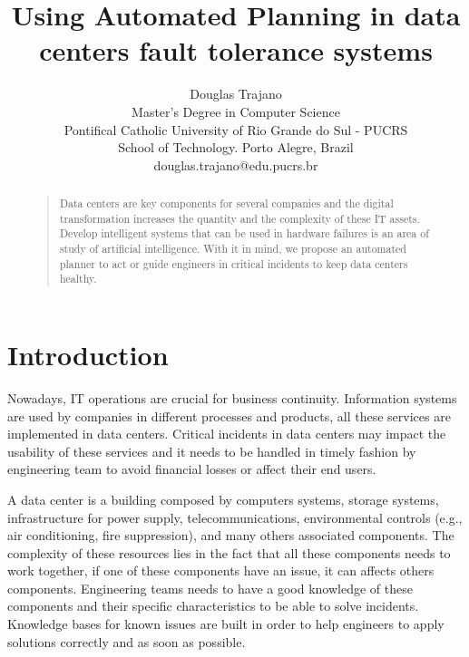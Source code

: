 \documentclass[letterpaper]{article}
\begin{document}
%
\title{Using Automated Planning in data centers fault tolerance systems}
\author{Douglas Trajano\\
Master's Degree in Computer Science\\
Pontifical Catholic University of Rio Grande do Sul - PUCRS\\
School of Technology. Porto Alegre, Brazil\\
douglas.trajano@edu.pucrs.br
}
\maketitle
\begin{abstract}
\begin{quote}
Data centers are key components for several companies and the digital transformation increases the quantity and the complexity of these IT assets. Develop intelligent systems that can be used in hardware failures is an area of study of artificial intelligence. With it in mind, we propose an automated planner to act or guide engineers in critical incidents to keep data centers healthy.
\end{quote}
\end{abstract}

\section{Introduction}

Nowadays, IT operations are crucial for business continuity. Information systems are used by companies in different processes and products, all these services are implemented in data centers. Critical incidents in data centers may impact the usability of these services and it needs to be handled in timely fashion by engineering team to avoid financial losses or affect their end users.

A data center is a building composed by computers systems, storage systems, infrastructure for power supply, telecommunications, environmental controls (e.g., air conditioning, fire suppression), and many others associated components. The complexity of these resources lies in the fact that all these components needs to work together, if one of these components have an issue, it can affects others components. Engineering teams needs to have a good knowledge of these components and their specific characteristics to be able to solve incidents. Knowledge bases for known issues are built in order to help engineers to apply solutions correctly and as soon as possible.
\end{document}
